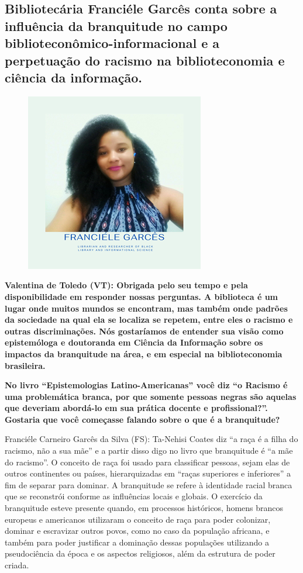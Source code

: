 \documentclass[a4paper,
fontsize=11pt,
oneside,
numbers=noperiodatend,
parskip=half-,
bibliography=totoc,
final
]{scrartcl}
\begin{document}
\subsection*{Bibliotecária Franciéle Garcês conta sobre a influência da branquitude
no campo biblioteconômico-informacional e a perpetuação do racismo na
biblioteconomia e ciência da informação.}

\begin{figure}[h!]
\centering
\includegraphics{img/img2.PNG}
\end{figure}

\textbf{Valentina de Toledo (VT): Obrigada pelo seu tempo e pela
disponibilidade em responder nossas perguntas. A biblioteca é um lugar
onde muitos mundos se encontram, mas também onde padrões da sociedade na
qual ela se localiza se repetem, entre eles o racismo e outras
discriminações. Nós gostaríamos de entender sua visão como epistemóloga
e doutoranda em Ciência da Informação sobre os impactos da branquitude
na área, e em especial na biblioteconomia brasileira.}

\textbf{No livro \enquote{Epistemologias Latino-Americanas} você diz
\enquote{o Racismo é uma problemática branca, por que somente pessoas
negras são aquelas que deveriam abordá-lo em sua prática docente e
profissional?}. Gostaria que você começasse falando sobre o que é a
branquitude?}

Franciéle Carneiro Garcês da Silva (FS): Ta-Nehisi Coates diz \enquote{a
raça é a filha do racismo, não a sua mãe} e a partir disso digo no livro
que branquitude é \enquote{a mãe do racismo}. O conceito de raça foi
usado para classificar pessoas, sejam elas de outros continentes ou
países, hierarquizadas em \enquote{raças superiores e inferiores} a fim
de separar para dominar. A branquitude se refere à identidade racial
branca que se reconstrói conforme as influências locais e globais. O
exercício da branquitude esteve presente quando, em processos
históricos, homens brancos europeus e americanos utilizaram o conceito
de raça para poder colonizar, dominar e escravizar outros povos, como no
caso da população africana, e também para poder justificar a dominação
dessas populações utilizando a pseudociência da época e os aspectos
religiosos, além da estrutura de poder criada.
\end{document}
